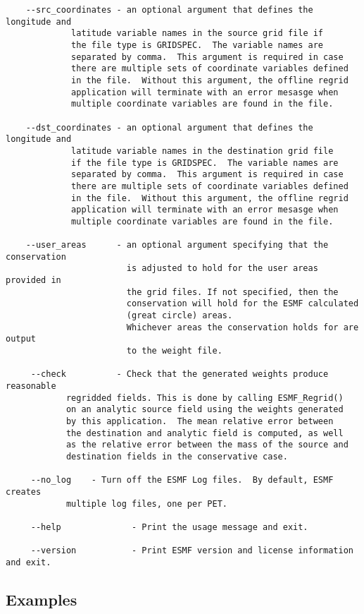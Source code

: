 \begin{verbatim}
    --src_coordinates - an optional argument that defines the longitude and
			 latitude variable names in the source grid file if
			 the file type is GRIDSPEC.  The variable names are
			 separated by comma.  This argument is required in case
			 there are multiple sets of coordinate variables defined
			 in the file.  Without this argument, the offline regrid
			 application will terminate with an error mesasge when
			 multiple coordinate variables are found in the file.

    --dst_coordinates - an optional argument that defines the longitude and
			 latitude variable names in the destination grid file
			 if the file type is GRIDSPEC.  The variable names are
			 separated by comma.  This argument is required in case
			 there are multiple sets of coordinate variables defined
			 in the file.  Without this argument, the offline regrid
			 application will terminate with an error mesasge when
			 multiple coordinate variables are found in the file.

    --user_areas      - an optional argument specifying that the conservation
                        is adjusted to hold for the user areas provided in
                        the grid files. If not specified, then the 
                        conservation will hold for the ESMF calculated 
                        (great circle) areas.
                        Whichever areas the conservation holds for are output
                        to the weight file.

     --check          - Check that the generated weights produce reasonable 
			regridded fields. This is done by calling ESMF_Regrid() 
			on an analytic source field using the weights generated 
			by this application.  The mean relative error between 
			the destination and analytic field is computed, as well 
			as the relative error between the mass of the source and 
			destination fields in the conservative case.

     --no_log    - Turn off the ESMF Log files.  By default, ESMF creates 
			multiple log files, one per PET.

     --help              - Print the usage message and exit.

     --version           - Print ESMF version and license information and exit.

\end{verbatim}


\subsection{Examples}

